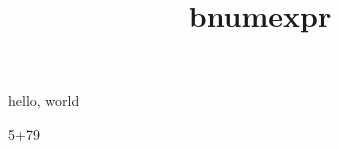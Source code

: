 \documentclass{amsart}
\title{bnumexpr}
\begin{document}
\maketitle

hello, world

 5+79\relax
\end{document}
